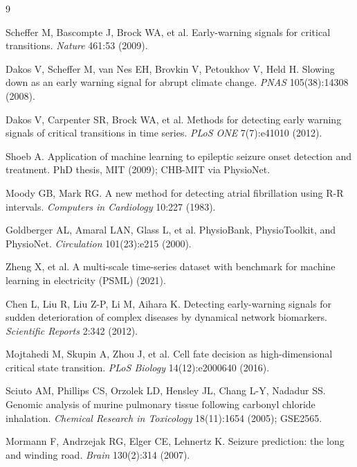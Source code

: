 \documentclass[aip,cha,preprint,amsmath,amssymb]{revtex4-2}
\begin{document}
\begin{thebibliography}{9}

 Scheffer M, Bascompte J, Brock WA, et al.
Early-warning signals for critical transitions. \emph{Nature} 461:53
(2009).

 Dakos V, Scheffer M, van Nes EH, Brovkin V,
Petoukhov V, Held H. Slowing down as an early warning signal for abrupt
climate change. \emph{PNAS} 105(38):14308 (2008).

 Dakos V, Carpenter SR, Brock WA, et al. Methods for
detecting early warning signals of critical transitions in time series.
\emph{PLoS ONE} 7(7):e41010 (2012).

 Shoeb A. Application of machine learning to
epileptic seizure onset detection and treatment. PhD thesis, MIT
(2009); CHB-MIT via PhysioNet.

 Moody GB, Mark RG. A new method for detecting
atrial fibrillation using R-R intervals. \emph{Computers in Cardiology}
10:227 (1983).

 Goldberger AL, Amaral LAN, Glass L, et al.
PhysioBank, PhysioToolkit, and PhysioNet. \emph{Circulation}
101(23):e215 (2000).

 Zheng X, et al. A multi-scale time-series dataset
with benchmark for machine learning in electricity (PSML) (2021).

 Chen L, Liu R, Liu Z-P, Li M, Aihara K. Detecting
early-warning signals for sudden deterioration of complex diseases by
dynamical network biomarkers. \emph{Scientific Reports} 2:342 (2012).

 Mojtahedi M, Skupin A, Zhou J, et al. Cell fate
decision as high-dimensional critical state transition. \emph{PLoS
Biology} 14(12):e2000640 (2016).

 Sciuto AM, Phillips CS, Orzolek LD, Hensley JL,
Chang L-Y, Nadadur SS. Genomic analysis of murine pulmonary tissue
following carbonyl chloride inhalation. \emph{Chemical Research in
Toxicology} 18(11):1654 (2005); GSE2565.

 Mormann F, Andrzejak RG, Elger CE, Lehnertz K.
Seizure prediction: the long and winding road. \emph{Brain} 130(2):314
(2007).

\end{thebibliography}
\end{document}
